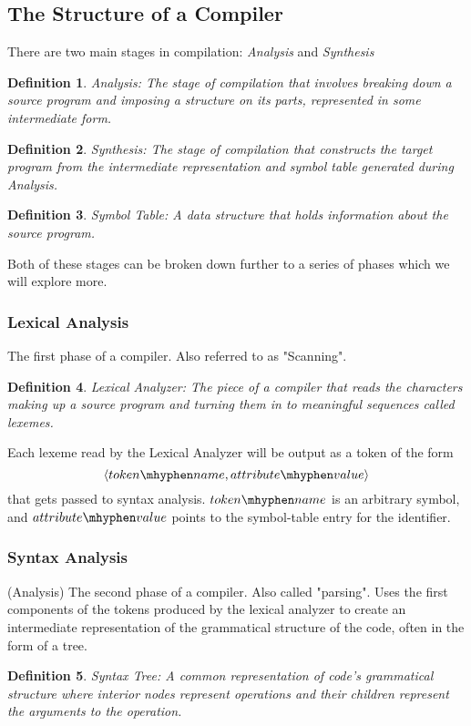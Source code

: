 \documentclass[titlepage]{article}
\newtheorem{definition}{Definition}
\begin{document}
\subsection{The Structure of a Compiler}
There are two main stages in compilation: \emph{Analysis} and \emph{Synthesis}
\begin{definition}
    \emph{Analysis}: The stage of compilation that involves breaking down a source program and imposing a structure on its parts, represented in some intermediate form.
\end{definition}
\begin{definition}
    \emph{Synthesis}: The stage of compilation that constructs the target program from the intermediate representation and symbol table generated during Analysis.
\end{definition}
\begin{definition}
    \emph{Symbol Table}: A data structure that holds information about the source program.
\end{definition}
Both of these stages can be broken down further to a series of phases which we will explore more.
\subsubsection*{Lexical Analysis}
The first phase of a compiler. Also referred to as "Scanning".
\begin{definition}
    \emph{Lexical Analyzer}: The piece of a compiler that reads the characters making up a source program and turning them in to meaningful sequences called lexemes.
\end{definition}
Each lexeme read by the Lexical Analyzer will be output as a token of the form
$$
    \langle token \mhyphen name, attribute\mhyphen value\rangle
$$
that gets passed to syntax analysis. $token \mhyphen name$ is an arbitrary symbol, and $attribute \mhyphen value$ points to the symbol-table entry for the identifier.

\subsubsection*{Syntax Analysis}
(Analysis)
The second phase of a compiler. Also called "parsing". Uses the first components of the tokens produced by the lexical analyzer to create an intermediate representation of the grammatical structure of the code, often in the form of a tree.
\begin{definition}
    \emph{Syntax Tree}: A common representation of code's grammatical structure where interior nodes represent operations and their children represent the arguments to the operation.
\end{definition}
\end{document}
